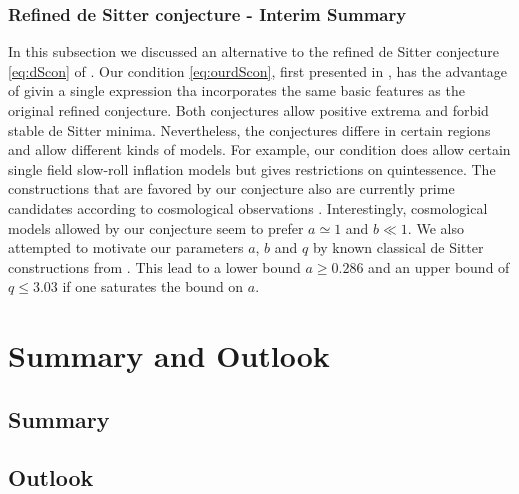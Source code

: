 \documentclass[12pt]{report}
\begin{document}
\subsection{Refined de Sitter conjecture - Interim Summary}
In this subsection we discussed an alternative to the refined de Sitter conjecture \eqref{eq:dScon} of \cite{Ooguri:2018wrx}. Our condition \eqref{eq:ourdScon}, first presented in \cite{Andriot:2018mav}, has the advantage of givin a single expression tha incorporates the same basic features as the original refined conjecture. Both conjectures allow positive extrema and forbid stable de Sitter minima. Nevertheless, the conjectures differe in certain regions and allow different kinds of models. For example, our condition does allow certain single field slow-roll inflation models but gives restrictions on quintessence. The constructions that are favored by our conjecture also are currently prime candidates according to cosmological observations \cite{Planck:2018jri}. Interestingly, cosmological models allowed by our conjecture seem to prefer $a\simeq 1$ and $b \ll 1$. We also attempted to motivate our parameters $a$, $b$ and $q$ by known classical de Sitter constructions from \cite{Danielsson:2012et,Roupec:2018mbn}. This lead to a lower bound $a \geq 0.286$ and an upper bound of $q\leq 3.03$ if one saturates the bound on $a$.

\chapter{Summary and Outlook}
\section{Summary}

\section{Outlook}

\newpage
\end{document}
